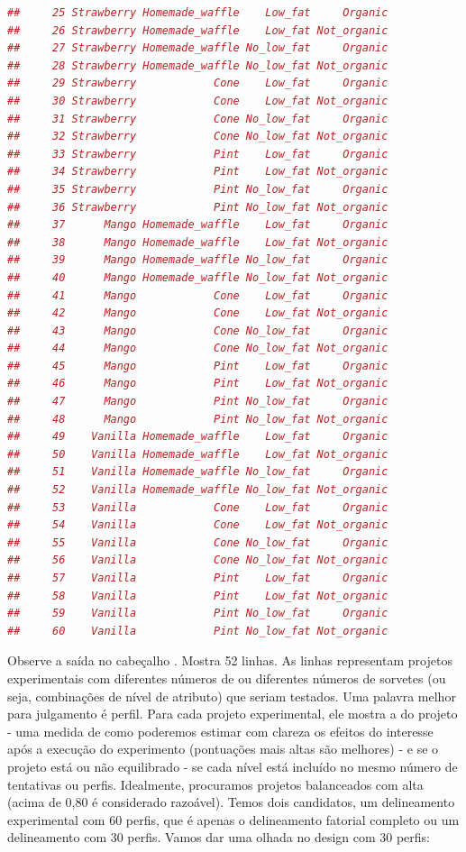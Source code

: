 \documentclass{article}
\begin{document}
\begin{lstlisting}[language=R]
##     25 Strawberry Homemade_waffle    Low_fat     Organic
##     26 Strawberry Homemade_waffle    Low_fat Not_organic
##     27 Strawberry Homemade_waffle No_low_fat     Organic
##     28 Strawberry Homemade_waffle No_low_fat Not_organic
##     29 Strawberry            Cone    Low_fat     Organic
##     30 Strawberry            Cone    Low_fat Not_organic
##     31 Strawberry            Cone No_low_fat     Organic
##     32 Strawberry            Cone No_low_fat Not_organic
##     33 Strawberry            Pint    Low_fat     Organic
##     34 Strawberry            Pint    Low_fat Not_organic
##     35 Strawberry            Pint No_low_fat     Organic
##     36 Strawberry            Pint No_low_fat Not_organic
##     37      Mango Homemade_waffle    Low_fat     Organic
##     38      Mango Homemade_waffle    Low_fat Not_organic
##     39      Mango Homemade_waffle No_low_fat     Organic
##     40      Mango Homemade_waffle No_low_fat Not_organic
##     41      Mango            Cone    Low_fat     Organic
##     42      Mango            Cone    Low_fat Not_organic
##     43      Mango            Cone No_low_fat     Organic
##     44      Mango            Cone No_low_fat Not_organic
##     45      Mango            Pint    Low_fat     Organic
##     46      Mango            Pint    Low_fat Not_organic
##     47      Mango            Pint No_low_fat     Organic
##     48      Mango            Pint No_low_fat Not_organic
##     49    Vanilla Homemade_waffle    Low_fat     Organic
##     50    Vanilla Homemade_waffle    Low_fat Not_organic
##     51    Vanilla Homemade_waffle No_low_fat     Organic
##     52    Vanilla Homemade_waffle No_low_fat Not_organic
##     53    Vanilla            Cone    Low_fat     Organic
##     54    Vanilla            Cone    Low_fat Not_organic
##     55    Vanilla            Cone No_low_fat     Organic
##     56    Vanilla            Cone No_low_fat Not_organic
##     57    Vanilla            Pint    Low_fat     Organic
##     58    Vanilla            Pint    Low_fat Not_organic
##     59    Vanilla            Pint No_low_fat     Organic
##     60    Vanilla            Pint No_low_fat Not_organic
\end{lstlisting}

Observe a saída no cabeçalho . Mostra 52 linhas. As linhas representam projetos experimentais com diferentes números de  ou diferentes números de sorvetes (ou seja, combinações de nível de atributo) que seriam testados. Uma palavra melhor para julgamento é perfil. Para cada projeto experimental, ele mostra a  do projeto - uma medida de como poderemos estimar com clareza os efeitos do interesse após a execução do experimento (pontuações mais altas são melhores) - e se o projeto está ou não equilibrado - se cada nível está incluído no mesmo número de tentativas ou perfis. Idealmente, procuramos projetos balanceados com alta  (acima de 0,80 é considerado razoável). Temos dois candidatos, um delineamento experimental com 60 perfis, que é apenas o delineamento fatorial completo ou um delineamento com 30 perfis. Vamos dar uma olhada no design com 30 perfis:
\end{document}

